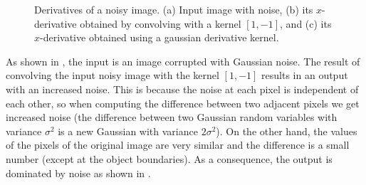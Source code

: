 \begin{figure}[h]
	\centerline{
	}
	\caption{Derivatives of a noisy image.
		(a) Input image with noise, (b) its $x$-derivative obtained by convolving with a kernel $[1, -1]$, and (c) its $x$-derivative obtained using a gaussian derivative kernel.}
	\label{fig:derivativesnoisystop}
\end{figure}

As shown in \fig{\ref{fig:derivativesnoisystop}}, the input is an image corrupted with Gaussian noise. The result of convolving the input noisy image with the kernel $[1, -1]$ results in an output with an increased noise. This is because the noise at each pixel is independent of each other, so when computing the difference between two adjacent pixels we get increased noise (the difference between two Gaussian random variables with variance $\sigma^2$ is a new Gaussian with variance $2\sigma^2$). On the other hand, the values of the  pixels of the original image are very similar and the difference is a small number (except at the object boundaries). As a consequence, the output is dominated by noise as shown in .


